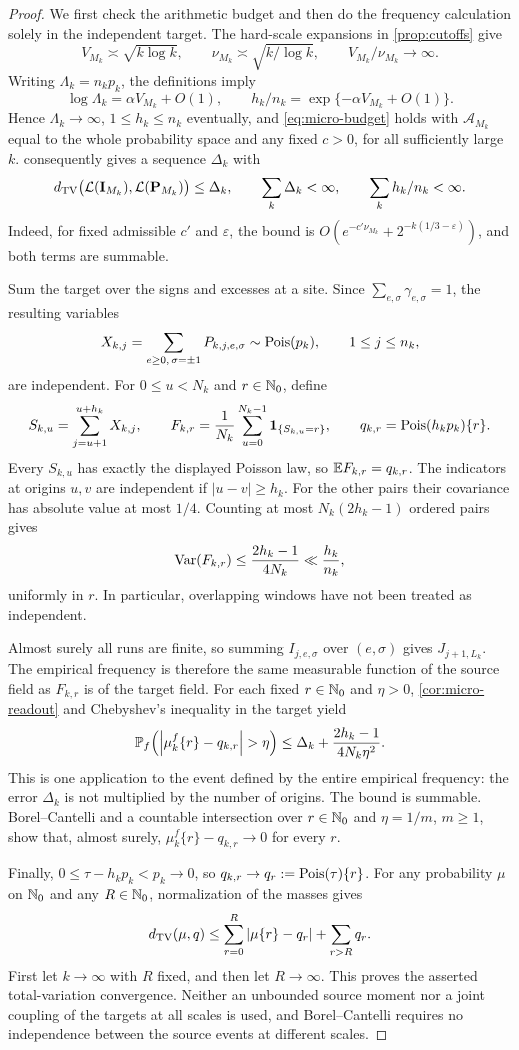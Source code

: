 \begin{proof}
We first check the arithmetic budget and then do the frequency
calculation solely in the independent target. The hard-scale
expansions in \cref{prop:cutoffs} give
\[
 V_{M_k}\asymp\sqrt{k\log k},\qquad
 \nu_{M_k}\asymp\sqrt{k/\log k},\qquad
 V_{M_k}/\nu_{M_k}\longrightarrow\infty.
\]
Writing $\Lambda_k=n_kp_k$, the definitions imply
\[
 \log\Lambda_k=\alpha V_{M_k}+O(1),\qquad
 h_k/n_k=\exp\{-\alpha V_{M_k}+O(1)\}.
\]
Hence $\Lambda_k\to\infty$, $1\le h_k\le n_k$ eventually, and
\eqref{eq:micro-budget} holds with $\mathcal A_{M_k}$ equal to the whole
probability space and any fixed $c>0$, for all sufficiently large $k$.
 consequently gives a sequence $\Delta_k$ with
\[
 d_{\mathrm{TV}}\bigl(\mathcal L(\mathbf I_{M_k}),\mathcal L(\mathbf P_{M_k})\bigr)
 \le\Delta_k,\qquad
 \sum_k\Delta_k<\infty,\qquad
 \sum_k h_k/n_k<\infty.
\]
Indeed, for fixed admissible $c'$ and $\varepsilon$, the bound is
$O(e^{-c'\nu_{M_k}}+2^{-k(1/3-\varepsilon)})$, and both terms are
summable.

Sum the target over the signs and excesses at a site. Since
$\sum_{e,\sigma}\gamma_{e,\sigma}=1$, the resulting variables
\[
 X_{k,j}=\sum_{e\ge0,\,\sigma=\pm1}P_{k,j,e,\sigma}
 \sim\operatorname{Pois}(p_k),\qquad 1\le j\le n_k,
\]
are independent. For $0\le u<N_k$ and $r\in\mathbb N_0$, define
\[
 S_{k,u}=\sum_{j=u+1}^{u+h_k}X_{k,j},\qquad
 F_{k,r}=\frac1{N_k}\sum_{u=0}^{N_k-1}\mathbf 1_{\{S_{k,u}=r\}},
 \qquad q_{k,r}=\operatorname{Pois}(h_kp_k)\{r\}.
\]
Every $S_{k,u}$ has exactly the displayed Poisson law, so
$\mathbb E F_{k,r}=q_{k,r}$. The indicators at origins $u,v$ are independent
if $|u-v|\ge h_k$. For the other pairs their covariance has absolute
value at most $1/4$. Counting at most $N_k(2h_k-1)$ ordered pairs gives
\[
 \operatorname{Var}(F_{k,r})\le\frac{2h_k-1}{4N_k}\ll\frac{h_k}{n_k},
\]
uniformly in $r$. In particular, overlapping windows have not been
treated as independent.

Almost surely all runs are finite, so summing
$I_{j,e,\sigma}$ over $(e,\sigma)$ gives $J_{j+1,L_k}$.
The empirical frequency is therefore the same measurable function of
the source field as $F_{k,r}$ is of the target field. For each fixed
$r\in\mathbb N_0$ and $\eta>0$, \cref{cor:micro-readout} and Chebyshev's
inequality in the target yield
\[
 \PP_f\!\left(\left|\mu_k^f\{r\}-q_{k,r}\right|>\eta\right)
 \le\Delta_k+\frac{2h_k-1}{4N_k\eta^2}.
\]
This is one application to the event defined by the entire empirical
frequency: the error $\Delta_k$ is not multiplied by the number of
origins. The bound is summable. Borel--Cantelli and a countable
intersection over $r\in\mathbb N_0$ and $\eta=1/m$, $m\ge1$, show that, almost
surely, $\mu_k^f\{r\}-q_{k,r}\to0$ for every $r$.

Finally, $0\le\tau-h_kp_k<p_k\to0$, so
$q_{k,r}\to q_r:=\operatorname{Pois}(\tau)\{r\}$. For any probability $\mu$ on
$\mathbb N_0$ and any $R\in\mathbb N_0$, normalization of the masses gives
\[
 d_{\mathrm{TV}}(\mu,q)
 \le\sum_{r=0}^{R}|\mu\{r\}-q_r|+\sum_{r>R}q_r.
\]
First let $k\to\infty$ with $R$ fixed, and then let $R\to\infty$.
This proves the asserted total-variation convergence. Neither an
unbounded source moment nor a joint coupling of the targets at all
scales is used, and Borel--Cantelli requires no independence between
the source events at different scales.
\end{proof}

